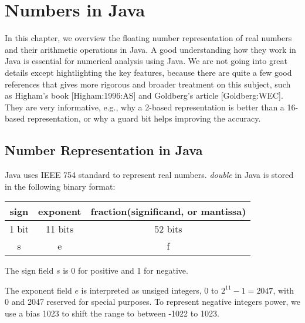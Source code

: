 \chapter{Numbers in Java}
\minitoc
In this chapter, we overview the floating number representation of real numbers and their arithmetic operations in Java. A good understanding how they work in Java is essential for numerical analysis using Java. We are not going into great details except hightlighting the key features, because there are quite a few good references that gives more rigorous and broader treatment on this subject, such as Higham's book [Higham:1996:AS] and Goldberg's article [Goldberg:WEC]. They are very informative, e.g., why a 2-based representation is better than a 16-based representation, or why a guard bit helps improving the accuracy.

\section{Number Representation in Java}
Java uses IEEE 754 standard to represent real numbers. \textit{double} in Java is stored in the following binary format:
\begin{center}
\begin{tabular}{ | c | c | c | }
   \hline
   sign & exponent & fraction(significand, or mantissa) \\ 
   \hline
   1 bit & 11 bits & 52 bits \\  
   \hline
   s & e & f \\
   \hline
\end{tabular}
\end{center}

The sign field $s$ is 0 for positive and 1 for negative.

The exponent field $e$ is interpreted as unsiged integers, 0 to $2^{11}-1 = 2047$, with 0 and 2047 reserved for special purposes. To represent negative integers power, we use a bias 1023 to shift the range to between -1022 to 1023.

